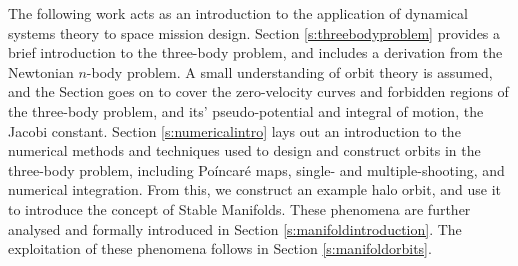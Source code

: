 \begin{multicols*}{2}



The following work acts as an introduction to the application of dynamical systems theory to space mission design. Section \ref{s:threebodyproblem} provides a brief introduction to the three-body problem, and includes a derivation from the Newtonian $n$-body problem. A small understanding of orbit theory is assumed, and the Section goes on to cover the zero-velocity curves and forbidden regions of the three-body problem, and its' pseudo-potential and integral of motion, the Jacobi constant. Section \ref{s:numericalintro} lays out an introduction to the numerical methods and techniques used to design and construct orbits in the three-body problem, including Po\'incar\'e maps, single- and multiple-shooting, and numerical integration. From this, we construct an example halo orbit, and use it to introduce the concept of Stable Manifolds. These phenomena are further analysed and formally introduced in Section \ref{s:manifoldintroduction}. The exploitation of these phenomena follows in Section \ref{s:manifoldorbits}.



\end{multicols*}